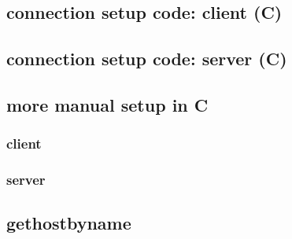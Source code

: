\subsection{connection setup code: client (C)}
 

\subsection{connection setup code: server (C)}
 

\subsection{more manual setup in C}
\subsubsection{client}
 
\subsubsection{server}
 

\subsection{gethostbyname}
 
